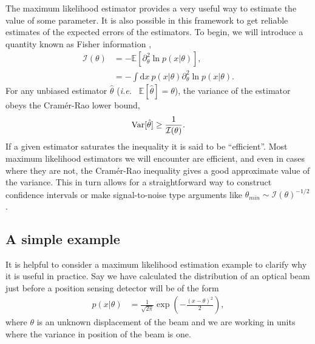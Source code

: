 The maximum likelihood estimator provides a very useful way to estimate the value of some parameter.  It is also possible in this framework to get reliable estimates of the expected errors of the estimators.  To begin, we will introduce a quantity known as Fisher information \cite{Casella2002, Wasserman2004},
\begin{align}
\nonumber  \mathcal{I}(\theta) &= -\mathbb{E}\left[\partial^2_\theta \ln p(x|\theta)\right], \\
                               &= -\int \text{d}x~ p(x|\theta)\partial^2_\theta \ln p(x|\theta).
\end{align}
For any unbiased estimator $\hat{\theta}$ (\emph{i.e.~} $\mathbb{E}[\hat{\theta}] = \theta$), the variance of the estimator obeys the Cram\'{e}r-Rao lower bound,
\begin{align}
  {\rm {Var}}[\hat{\theta}] \ge \frac{1}{\mathcal{I}(\theta)}.
\end{align}
If a given estimator saturates the inequality it is said to be ``efficient''.  Most maximum likelihood estimators we will encounter are efficient, and even in cases where they are not, the Cram\'{e}r-Rao inequality gives a good approximate value of the variance.  This in turn allows for a straightforward way to construct confidence intervals or make signal-to-noise type arguments like $\theta_{min} \sim \mathcal{I}(\theta)^{-1/2}$.

\subsection{A simple example}
It is helpful to consider a maximum likelihood estimation example to clarify why it is useful in practice.  Say we have calculated the distribution of an optical beam just before a position sensing detector will be of the form
\begin{align}
  p(x|\theta) &= \frac{1}{\sqrt{2\pi}}\exp\left(-\frac{(x-\theta)^2}{2} \right),
\end{align}
where $\theta$ is an unknown displacement of the beam and we are working in units where the variance in position of the beam is one.

